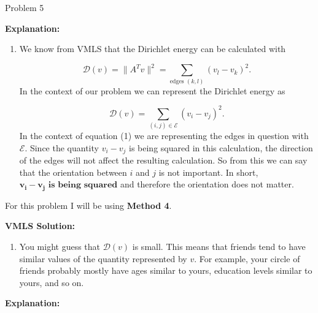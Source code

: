 \begin{problem}{Problem 5}
\begin{highlight}
        \noindent \textbf{Explanation:}

        \begin{enumerate}[label = (\alph*)]
            \item We know from VMLS that the Dirichlet energy can be calculated with 
            
            \begin{equation*}
                \mathcal{D}(v) = \|A^{T}v\|^{2} = \sum_{\text{edges } (k,l)} (v_{l} - v_{k})^{2}.
            \end{equation*}
            In the context of our problem we can represent the Dirichlet energy as

            \setcounter{equation}{0}
            \begin{equation}
                \mathcal{D}(v) = \sum_{(i,j) \in \mathcal{E}} (v_{i} - v_{j})^{2}.
            \end{equation}
            In the context of equation (1) we are representing the edges in question with $\mathcal{E}$. Since the quantity $v_{i} - v_{j}$ is being squared in this calculation, the direction of the 
            edges will not affect the resulting calculation. So from this we can say that the orientation between $i$ and $j$ is not important. In short, $\mathbf{v_{i} - v_{j}} \textbf{ is being squared}$ 
            and therefore the orientation does not matter.
        \end{enumerate}
    \end{highlight}

    \begin{highlight}
        For this problem I will be using \textbf{Method 4}. \vspace*{1em}

        \noindent \textbf{VMLS Solution:} 

        \begin{enumerate}[label = (\alph*), start = 2]
            \item You might guess that $\mathcal{D}(v)$ is small. This means that friends tend to have similar values of the quantity represented by $v$. For example, your circle of friends probably mostly 
            have ages similar to yours, education levels similar to yours, and so on.
        \end{enumerate}

        \noindent \textbf{Explanation:} 


\end{highlight}
\end{problem}
